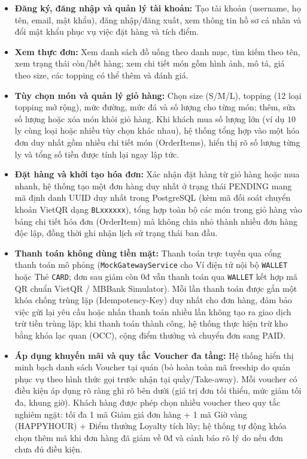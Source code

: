 \documentclass[12pt,a4paper]{report}
\begin{document}
\begin{itemize}[leftmargin=*]
\item \textbf{Đăng ký, đăng nhập và quản lý tài khoản:} Tạo tài khoản (username, họ tên, email, mật khẩu), đăng nhập/đăng xuất, xem thông tin hồ sơ cá nhân và đổi mật khẩu phục vụ việc đặt hàng và tích điểm.
\item \textbf{Xem thực đơn:} Xem danh sách đồ uống theo danh mục, tìm kiếm theo tên, xem trạng thái còn/hết hàng; xem chi tiết món gồm hình ảnh, mô tả, giá theo size, các topping có thể thêm và đánh giá.
\item \textbf{Tùy chọn món và quản lý giỏ hàng:} Chọn size (S/M/L), topping (12 loại topping mở rộng), mức đường, mức đá và số lượng cho từng món; thêm, sửa số lượng hoặc xóa món khỏi giỏ hàng. Khi khách mua số lượng lớn (ví dụ $10$ ly cùng loại hoặc nhiều tùy chọn khác nhau), hệ thống tổng hợp vào một hóa đơn duy nhất gồm nhiều chi tiết món (OrderItems), hiển thị rõ số lượng từng ly và tổng số tiền được tính lại ngay lập tức.
\item \textbf{Đặt hàng và khởi tạo hóa đơn:} Xác nhận đặt hàng từ giỏ hàng hoặc mua nhanh, hệ thống tạo một đơn hàng duy nhất ở trạng thái PENDING mang mã định danh UUID duy nhất trong PostgreSQL (kèm mã đối soát chuyển khoản VietQR dạng \texttt{BLxxxxxx}), tổng hợp toàn bộ các món trong giỏ hàng vào bảng chi tiết hóa đơn (OrderItem) mà không chia nhỏ thành nhiều đơn hàng độc lập, đồng thời ghi nhận lịch sử trạng thái ban đầu.
\item \textbf{Thanh toán không dùng tiền mặt:} Thanh toán trực tuyến qua cổng thanh toán mô phỏng (\texttt{MockGatewayService} cho Ví điện tử nội bộ \texttt{WALLET} hoặc Thẻ \texttt{CARD}; đơn sau giảm còn 0đ vẫn thanh toán qua \texttt{WALLET} kết hợp mã QR chuẩn VietQR / MBBank Simulator). Mỗi lần thanh toán được gắn một khóa chống trùng lặp (Idempotency-Key) duy nhất cho đơn hàng, đảm bảo việc gửi lại yêu cầu hoặc nhấn thanh toán nhiều lần không tạo ra giao dịch trừ tiền trùng lặp; khi thanh toán thành công, hệ thống thực hiện trừ kho bằng khóa lạc quan (OCC), cộng điểm thưởng và chuyển đơn sang PAID.
\item \textbf{Áp dụng khuyến mãi và quy tắc Voucher đa tầng:} Hệ thống hiển thị minh bạch danh sách Voucher tại quán (bỏ hoàn toàn mã freeship do quán phục vụ theo hình thức gọi trước nhận tại quầy/Take-away). Mỗi voucher có điều kiện áp dụng rõ ràng ghi rõ bên dưới (giá trị đơn tối thiểu, mức giảm tối đa, khung giờ). Khách hàng được phép chọn nhiều voucher theo quy tắc nghiêm ngặt: tối đa 1 mã Giảm giá đơn hàng + 1 mã Giờ vàng (HAPPYHOUR) + Điểm thưởng Loyalty tích lũy; hệ thống tự động khóa chọn thêm mã khi đơn hàng đã giảm về 0đ và cảnh báo rõ lý do nếu đơn chưa đủ điều kiện.

\end{itemize}
\end{document}
